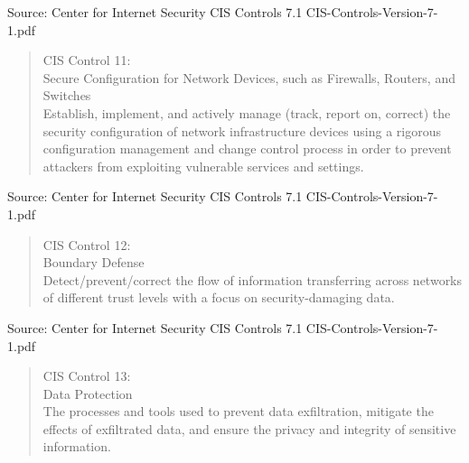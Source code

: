 \documentclass[Screen16to9,17pt]{foils}
\begin{document}
Source: Center for Internet Security CIS Controls 7.1 CIS-Controls-Version-7-1.pdf


\begin{quote}
CIS Control 11:\\
Secure Configuration for Network Devices, such as Firewalls, Routers, and Switches\\
Establish, implement, and actively manage (track, report on, correct) the security configuration of network infrastructure devices using a rigorous configuration management and change control process in order to prevent attackers from exploiting vulnerable services and settings.
\end{quote}

\begin{list1}
\item
\item
\item
\item
\end{list1}

Source: Center for Internet Security CIS Controls 7.1 CIS-Controls-Version-7-1.pdf


\begin{quote}
CIS Control 12:\\
Boundary Defense\\
Detect/prevent/correct the flow of information transferring across networks of different trust levels with a focus on security-damaging data.
\end{quote}

\begin{list1}
\item
\item
\item
\item
\end{list1}

Source: Center for Internet Security CIS Controls 7.1 CIS-Controls-Version-7-1.pdf


\begin{quote}
CIS Control 13:\\
Data Protection\\
The processes and tools used to prevent data exfiltration, mitigate the effects of exfiltrated data, and ensure the privacy and integrity of sensitive information.
\end{quote}
\end{document}
